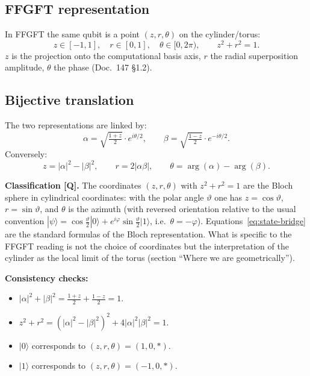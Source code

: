 \subsection{FFGFT representation}

In FFGFT the same qubit is a point $(z, r, \theta)$ on the
cylinder/torus:
\begin{equation}
  z \in [-1, 1], \quad r \in [0, 1], \quad \theta \in [0, 2\pi),
  \qquad
  z^2 + r^2 = 1.
\end{equation}
$z$ is the projection onto the computational basis axis, $r$ the
radial superposition amplitude, $\theta$ the phase (Doc.~147 §1.2).

\subsection{Bijective translation}

The two representations are linked by:
\begin{equation}
  \boxed{
  \alpha = \sqrt{\tfrac{1+z}{2}} \cdot e^{i\theta/2},
  \qquad
  \beta = \sqrt{\tfrac{1-z}{2}} \cdot e^{-i\theta/2}.}
  \label{eq:state-bridge}
\end{equation}
Conversely:
\begin{equation}
  z = |\alpha|^2 - |\beta|^2,
  \qquad
  r = 2|\alpha\beta|,
  \qquad
  \theta = \arg(\alpha) - \arg(\beta).
\end{equation}

\textbf{Classification [Q].} The coordinates $(z, r, \theta)$ with
$z^2 + r^2 = 1$ are the Bloch sphere in cylindrical coordinates: with
the polar angle $\vartheta$ one has $z = \cos\vartheta$,
$r = \sin\vartheta$, and $\theta$ is the azimuth (with reversed
orientation relative to the usual convention
$|\psi\rangle = \cos\tfrac{\vartheta}{2}|0\rangle
+ e^{i\varphi}\sin\tfrac{\vartheta}{2}|1\rangle$, i.e.\
$\theta = -\varphi$). Equations~\eqref{eq:state-bridge} are the
standard formulas of the Bloch representation. What is specific to the
FFGFT reading is not the choice of coordinates but the interpretation
of the cylinder as the local limit of the torus (section \enquote{Where
we are geometrically}).

\textbf{Consistency checks:}
\begin{itemize}[leftmargin=2em,itemsep=2pt,topsep=2pt]
  \item $|\alpha|^2 + |\beta|^2 = \tfrac{1+z}{2} + \tfrac{1-z}{2} = 1$. \checkmark
  \item $z^2 + r^2 = (|\alpha|^2 - |\beta|^2)^2 + 4|\alpha|^2|\beta|^2 = 1$. \checkmark
  \item $|0\rangle$ corresponds to $(z,r,\theta) = (1, 0, *)$. \checkmark
  \item $|1\rangle$ corresponds to $(z,r,\theta) = (-1, 0, *)$. \checkmark
\end{itemize}

